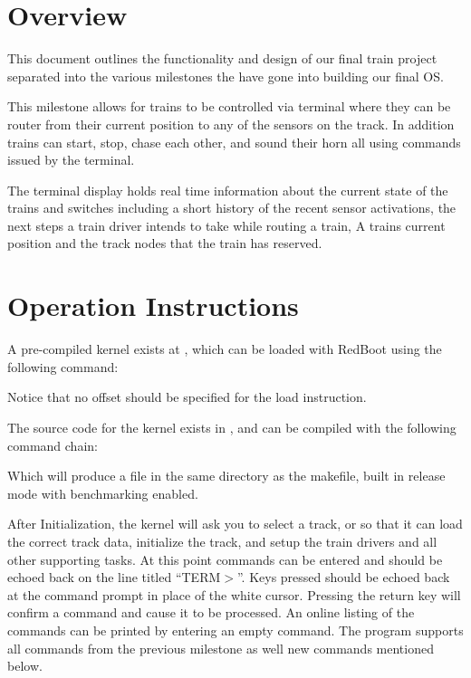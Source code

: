 \documentclass[pdftex,10pt,a4paper]{article}
\begin{document}
\finalprojectmake

\section*{Overview}

This document outlines the functionality and design of our final train project
separated into the various milestones the have gone into building our final OS.

This milestone allows for trains to be controlled via terminal where they can
be router from their current position to any of the sensors on the track. In
addition trains can start, stop, chase each other, and sound their horn all
using commands issued by the terminal.

The terminal display holds real time information about the current state of the
trains and switches including a short history of the recent sensor activations,
the next steps a train driver intends to take while routing a train, A trains
current position and the track nodes that the train has reserved.

\section*{Operation Instructions}

A pre-compiled kernel exists at
, which can be loaded with
RedBoot using the following command:

\begin{center}
\end{center}

Notice that no offset should be specified for the load instruction.

The source code for the kernel exists in ,
and can be compiled with the following command chain:

\begin{center}
\end{center}

Which will produce a  file in the same directory as
the makefile, built in release mode with benchmarking enabled.

After Initialization, the kernel will ask you to select a track,
 or  so that it can load the correct track data,
initialize the track, and setup the train drivers and all other
supporting tasks.  At this point commands can be entered and should be
echoed back on the line titled ``TERM$>$''. Keys pressed should be
echoed back at the command prompt in place of the white
cursor. Pressing the return key will confirm a command and cause it to
be processed. An online listing of the commands can be printed by
entering an empty command. The program supports all commands from the
previous milestone as well new commands mentioned below.
\end{document}

